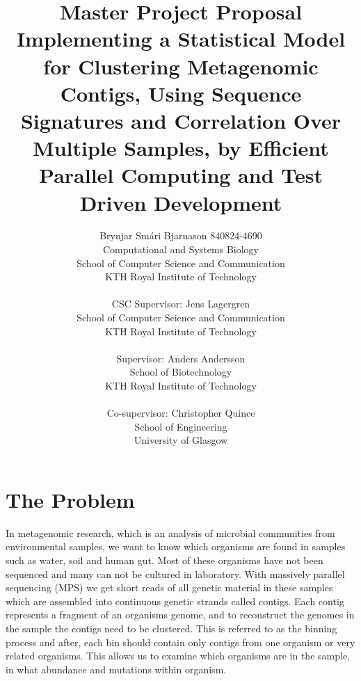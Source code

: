 \documentclass{article}
\begin{document}
\title {\onehalfspacing Master Project Proposal \\ \singlespacing Implementing a Statistical Model for Clustering Metagenomic Contigs, Using Sequence Signatures and Correlation Over Multiple Samples, by Efficient Parallel Computing and Test Driven Development}
\author{Brynjar Smári Bjarnason 840824-4690\\Computational and Systems Biology\\ School of Computer Science and Communication\\KTH Royal Institute of Technology \\ \\ 
        CSC Supervisor: Jens Lagergren\\School of Computer Science and Communication \\ KTH Royal Institute of Technology\\ \\
        Supervisor: Anders Andersson\\School of Biotechnology \\ KTH Royal Institute of Technology\\ \\
        Co-supervisor: Christopher Quince\\School of Engineering\\University of Glasgow}

\maketitle
\pagebreak
\section*{The Problem}
In metagenomic research, which is an analysis of microbial communities from environmental samples, we want to know which organisms are found in samples such as water, soil and human gut. Most of these organisms have not been sequenced and many can not be cultured in laboratory. With massively parallel sequencing (MPS) we get short reads of all genetic material in these samples which are assembled into continuous genetic strands called contigs. Each contig represents a fragment of an organisms genome, and to reconstruct the genomes in the sample the contigs need to be clustered. This is referred to as the binning process and after, each bin should contain only contigs from one organism or very related organisms. This allows us to examine which organisms are in the sample, in what abundance and mutations within organism. \\
\end{document}
